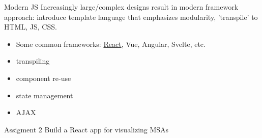 \documentclass[10pt]{beamer}
\begin{document}

\begin{frame}{Modern JS}
    Increasingly large/complex designs result in modern framework approach: introduce template language that emphasizes modularity, 'transpile' to HTML, JS, CSS.

    \begin{itemize}
        \item Some common frameworks: \underline{React}, Vue, Angular, Svelte, etc.
        \item transpiling
        \item component re-use
        \item state management
        \item AJAX
    \end{itemize}
\end{frame}

\begin{frame}{Assigment 2}
    Build a React app for visualizing MSAs
\end{frame}
\end{document}
